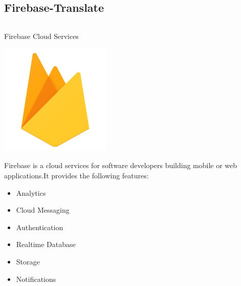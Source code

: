 \documentclass[xcolor=dvipsnames]{beamer}
\begin{document}
\subsection{Firebase-Translate}
\begin{frame}
\begin{columns}[c]
\begin{exampleblock}{\small{Firebase Cloud Services}}
\begin{center}
\includegraphics[scale=0.1]{images/firebase.png}\\
\end{center}
\small{
Firebase is a cloud services for software developers building mobile or web applications.It provides the following features:
\begin{itemize}
\item Analytics
\item Cloud Messaging
\item Authentication
\item Realtime Database
\item Storage
\item Notifications
\end{itemize}}
\end{exampleblock}


\end{columns}
\end{frame}
\end{document}

